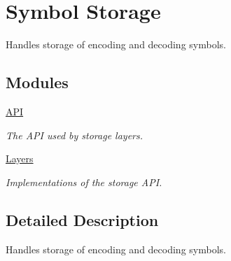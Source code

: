 \hypertarget{group__symbol__storage}{\section{Symbol Storage}
\label{group__symbol__storage}
}


Handles storage of encoding and decoding symbols.  


\subsection*{Modules}
\begin{DoxyCompactItemize}
\item 
\hyperlink{group__storage__api}{A\-P\-I}
\begin{DoxyCompactList}\small\item\em The A\-P\-I used by storage layers. \end{DoxyCompactList}\item 
\hyperlink{group__symbol__storage__layers}{Layers}
\begin{DoxyCompactList}\small\item\em Implementations of the storage A\-P\-I. \end{DoxyCompactList}\end{DoxyCompactItemize}


\subsection{Detailed Description}
Handles storage of encoding and decoding symbols. 